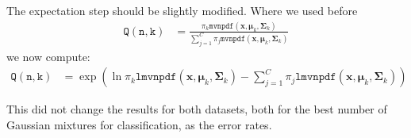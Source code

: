 \documentclass[a4paper,11pt]{article}
\newcommand{\V}[1]{\ensuremath{\mathbf{#1}}}
\newcommand{\T}[1]{\ensuremath{\mathtt{#1}}}
\newcommand{\muk}{\ensuremath{\boldsymbol{\mu}_k}}
\newcommand{\covk}{\ensuremath{\boldsymbol{\Sigma}_k}}
\newcommand{\mck}{\ensuremath{\pi_{k}}}
\begin{document}
The expectation step should be slightly modified.  Where we used before 
\begin{align*}
\mathtt{Q(n, k)} &= \frac{\mck \mathtt{mvnpdf}(\V{x}, \muk, \covk)}{\sum_{j=1}^C \pi_j \T{mvnpdf}(\V{x}, \muk, \covk)}
\end{align*} 
we now compute:
\begin{align*}
\mathtt{Q(n, k)} &= \exp\left( \ln\mck \mathtt{lmvnpdf}(\V{x}, \muk, \covk) - \sum_{j=1}^C \pi_j \T{lmvnpdf}(\V{x}, \muk, \covk)\right)
\end{align*}

This did not change the results for both datasets, both for the best number of Gaussian mixtures for classification, as the error rates. 



\end{document}
